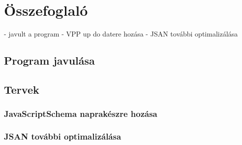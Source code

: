 \chapter{Összefoglaló}\label{chap:Összefoglaló}

- javult a program
- VPP up do datere hozása
- JSAN további optimalizálása
\section{Program javulása}

\section{Tervek}

\subsection{JavaScriptSchema naprakészre hozása}

\subsection{JSAN további optimalizálása}

